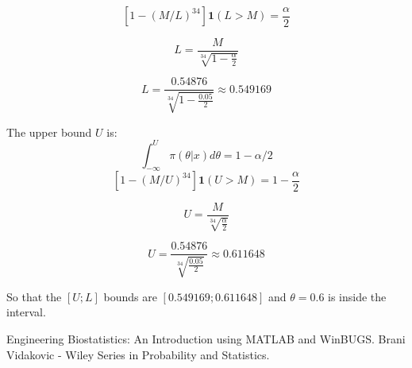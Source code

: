 \documentclass[a4 paper]{article}
\begin{document}
$$
\left[1-(M/L)^{34}\right]\mathbf{1}(L>M)=\frac{\alpha}{2}
$$

$$
L=\frac{M}{\sqrt[34]{1-\frac{\alpha}{2}}}
$$

$$
L=\frac{0.54876}{\sqrt[34]{1-\frac{0.05}{2}}}\approx 0.549169
$$

The upper bound $U$ is:
$$
\int_{-\infty}^{U} \pi(\theta | x) d \theta=1-\alpha / 2
$$
$$
\left[1-(M/U)^{34}\right]\mathbf{1}(U>M)=1-\frac{\alpha}{2}
$$

$$
U=\frac{M}{\sqrt[34]{\frac{\alpha}{2}}}
$$

$$
U=\frac{0.54876}{\sqrt[34]{\frac{0.05}{2}}}\approx 0.611648
$$

So that the $[U;L]$ bounds are $[0.549169;0.611648]$
and $\theta=0.6$ is inside the interval.



\begin{thebibliography}{9}


\label{stat} 
Engineering Biostatistics: An Introduction using MATLAB and WinBUGS. 
Brani Vidakovic - Wiley Series in Probability and Statistics.

\end{thebibliography}
\end{document}
